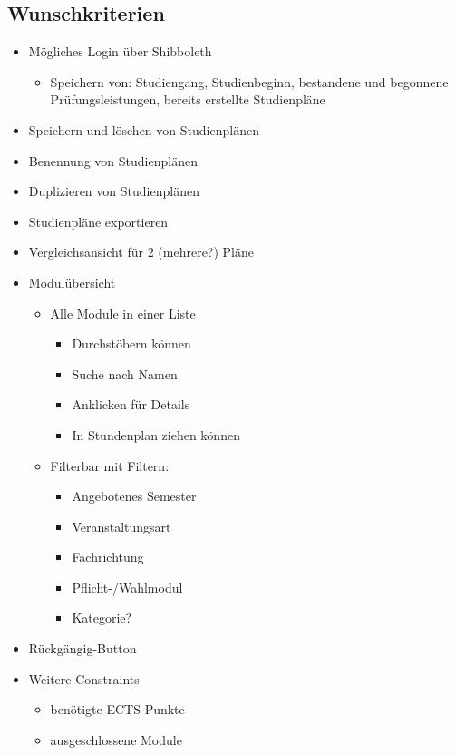 \documentclass[titlepage=true, parskip=full]{scrartcl}
\begin{document}
\subsection{Wunschkriterien}
\begin{itemize}
	\item Mögliches Login über Shibboleth
	\begin{itemize}
		\item Speichern von: Studiengang, Studienbeginn, bestandene und begonnene Prüfungsleistungen, bereits erstellte Studienpläne
	\end{itemize}
	\item Speichern und löschen von Studienplänen
	\item Benennung von Studienplänen
	\item Duplizieren von Studienplänen
	\item Studienpläne exportieren
	\item Vergleichsansicht für 2 (mehrere?) Pläne 
	\item Modulübersicht
	\begin{itemize}
		\item Alle Module in einer Liste
		\begin{itemize}
			\item Durchstöbern können
			\item Suche nach Namen
			\item Anklicken für Details
			\item In Stundenplan ziehen können
		\end{itemize}
		\item Filterbar mit Filtern: 
		\begin{itemize}
			\item Angebotenes Semester
			\item Veranstaltungsart
			\item Fachrichtung
			\item Pflicht-/Wahlmodul
			\item Kategorie?
		\end{itemize}
	\end{itemize}
	\item Rückgängig-Button
	\item Weitere Constraints
	\begin{itemize}
		\item benötigte ECTS-Punkte
		\item ausgeschlossene Module
	\end{itemize}
\end{itemize}
\end{document}
